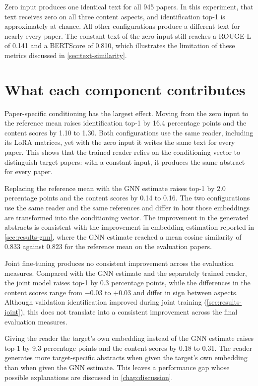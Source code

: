 Zero input produces one identical text for all 945 papers. In this experiment, that text receives zero on all three content aspects, and identification top-1 is approximately at chance. All other configurations produce a different text for nearly every paper. The constant text of the zero input still reaches a ROUGE-L of 0.141 and a BERTScore of 0.810, which illustrates the limitation of these metrics discussed in \autoref{sec:text-similarity}.

\section{What each component contributes}
\label{sec:ablation-contributions}

Paper-specific conditioning has the largest effect. Moving from the zero input to the reference mean raises identification top-1 by 16.4 percentage points and the content scores by 1.10 to 1.30. Both configurations use the same reader, including its LoRA matrices, yet with the zero input it writes the same text for every paper. This shows that the trained reader relies on the conditioning vector to distinguish target papers: with a constant input, it produces the same abstract for every paper.

Replacing the reference mean with the GNN estimate raises top-1 by 2.0 percentage points and the content scores by 0.14 to 0.16. The two configurations use the same reader and the same references and differ in how those embeddings are transformed into the conditioning vector. The improvement in the generated abstracts is consistent with the improvement in embedding estimation reported in \autoref{sec:results-gnn}, where the GNN estimate reached a mean cosine similarity of 0.833 against 0.823 for the reference mean on the evaluation papers.

Joint fine-tuning produces no consistent improvement across the evaluation measures. Compared with the GNN estimate and the separately trained reader, the joint model raises top-1 by 0.3 percentage points, while the differences in the content scores range from $-0.03$ to $+0.03$ and differ in sign between aspects. Although validation identification improved during joint training (\autoref{sec:results-joint}), this does not translate into a consistent improvement across the final evaluation measures.

Giving the reader the target's own embedding instead of the GNN estimate raises top-1 by 9.3 percentage points and the content scores by 0.18 to 0.31. The reader generates more target-specific abstracts when given the target's own embedding than when given the GNN estimate. This leaves a performance gap whose possible explanations are discussed in \autoref{chap:discussion}.

